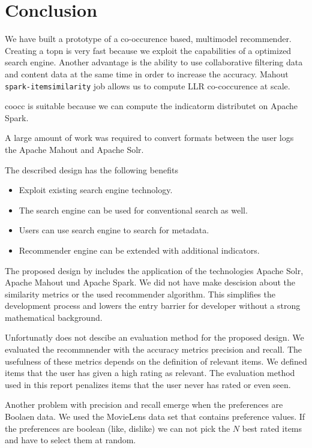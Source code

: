 \section{Conclusion}
\label{sec:conclusion}

We have built a prototype of a co-occurence based, multimodel recommender. Creating a \gls{topn} is very fast because we exploit the capabilities of a optimized search engine. Another advantage is the ability to use collaborative filtering data and content data at the same time in order to increase the accuracy. Mahout \verb|spark-itemsimilarity| job allows us to compute LLR co-coccurence at scale.

\gls{coocc} is suitable because we can compute the \gls{indicatorm} distributet on Apache Spark.

A large amount of work was required to convert formats between the user logs the Apache Mahout and Apache Solr.


The described design has the following benefits
\begin{itemize}
\item Exploit existing search engine technology.
\item The search engine can be used for conventional search as well.
\item Users can use search engine to search for metadata.
\item Recommender engine can be extended with additional indicators.
\end{itemize}


The proposed design by \cite{Dunning14} includes the application of the technologies Apache Solr, Apache Mahout und Apache Spark. We did not have make descision about the similarity metrics or the used recommender algorithm. This simplifies the development process and lowers the entry barrier for developer without a strong mathematical background. 

Unfortunatly \cite{Dunning14} does not descibe an evaluation method for the proposed design. We evaluated the recommnender with the accuracy metrics precision and recall. The usefulness of these metrics depends on the definition of relevant items. We defined items that the user has given a high rating as relevant. The evaluation method used in this report penalizes items that the user never has rated or even seen. 

Another problem with precision and recall emerge when the preferences are Boolaen data. We used the MovieLens data set that contains preference values. If the preferences are boolean (like, dislike) we can not pick the $N$ best rated items and have to select them at random.

